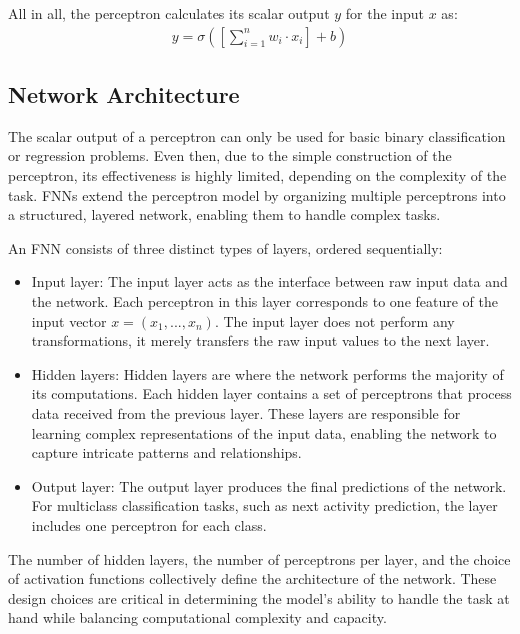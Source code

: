 All in all, the perceptron calculates its scalar output $y$ for the input $x$ as:
\begin{align}
  \label{math: perceptron}
	y = \sigma\left(\left[\sum_{i = 1}^n w_i \cdot x_i \right] + b\right)
\end{align}


\subsection{Network Architecture}
The scalar output of a perceptron can only be used for basic binary classification or regression problems.
Even then, due to the simple construction of the perceptron,
its effectiveness is highly limited, depending on the complexity of the task. \cite{perceptron_limited}
FNNs extend the perceptron model by organizing multiple perceptrons into a structured,
layered network, enabling them to handle complex tasks.

An FNN consists of three distinct types of layers, ordered sequentially:
\begin{itemize}
\item Input layer:
The input layer acts as the interface between raw input data and the network.
Each perceptron in this layer corresponds to one feature of the input vector $x = (x_1, ..., x_n)$.
The input layer does not perform any transformations, it merely transfers the raw input values to the next layer.
\item Hidden layers:
Hidden layers are where the network performs the majority of its computations.
Each hidden layer contains a set of perceptrons that process data received from the previous layer.
These layers are responsible for learning complex representations of the input data,
enabling the network to capture intricate patterns and relationships.
\item Output layer:
The output layer produces the final predictions of the network.
For multiclass classification tasks, such as next activity prediction,
the layer includes one perceptron for each class.
\end{itemize}

The number of hidden layers, the number of perceptrons per layer,
and the choice of activation functions collectively define the architecture of the network.
These design choices are critical in determining the model's ability to handle the task at hand
while balancing computational complexity and capacity.


